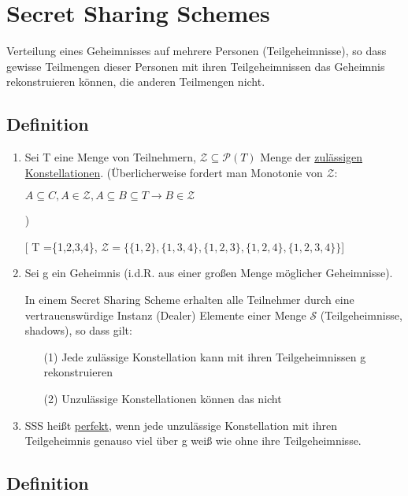 \chapter{Secret Sharing Schemes}

  Verteilung eines Geheimnisses auf mehrere Personen (Teilgeheimnisse), so dass gewisse Teilmengen dieser Personen mit ihren Teilgeheimnissen das Geheimnis rekonstruieren können, die anderen Teilmengen nicht.

  \section{Definition}

  \begin{enumerate}[label=(\alph*)]
    \item Sei T eine Menge von Teilnehmern, $\mathcal{Z} \subseteq \mathcal{P}(T)$ Menge der \underline{zulässigen Konstellationen}. (Überlicherweise fordert man Monotonie von $\mathcal{Z}$: 

    \begin{center}
      $A \subseteq C, A \in \mathcal{Z}, A \subseteq B \subseteq T \rightarrow B \in \mathcal{Z}$
    \end{center}

    )

    [ T =\{1,2,3,4\}, $\mathcal{Z} = \{\{1,2\}, \{1,3,4\}, \{1,2,3\}, \{1,2,4\}, \{1,2,3,4\}\}$]

    \item Sei g ein Geheimnis (i.d.R. aus einer großen Menge möglicher Geheimnisse).

    In einem Secret Sharing Scheme erhalten alle Teilnehmer durch eine vertrauenswürdige Instanz (Dealer) Elemente einer Menge $\mathcal{S}$ (Teilgeheimnisse, shadows), so dass gilt:

    \begin{enumerate}
      \item[(1)] Jede zulässige Konstellation kann mit ihren Teilgeheimnissen g rekonstruieren
      \item[(2)] Unzulässige Konstellationen können das nicht
    \end{enumerate}

    \item SSS heißt \underline{perfekt}, wenn jede unzulässige Konstellation mit ihren Teilgeheimnis genauso viel über g weiß wie ohne ihre Teilgeheimnisse.
  \end{enumerate}

  \section{Definition}


